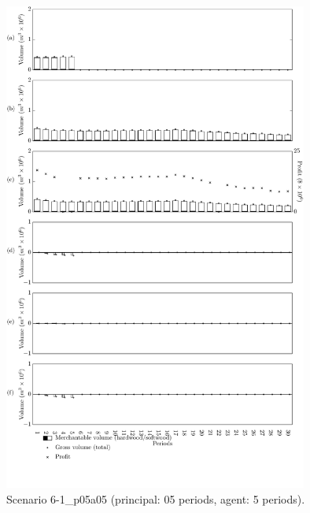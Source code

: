 \begin{figure}[h]
  \centering
  \includegraphics[width=10cm]{images/appendix/s6-1_p05a05}
  \caption{Scenario 6-1\_p05a05 (principal: 05 periods, agent: 5 periods).}
  \label{fig:s6-1_p05a05}
\end{figure}

